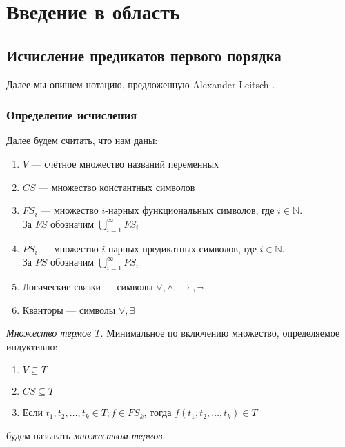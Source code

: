 \chapter{Введение в область}
\startrelatedwork
\label{sec:chap1}

\section{Исчисление предикатов первого порядка}

Далее мы опишем нотацию, предложенную Alexander Leitsch \cite{Leitsch:1997:RC:260906}.

\subsection{Определение исчисления}

Далее будем считать, что нам даны:
\begin{enumerate}
	\item $V$    --- счётное множество названий переменных
    \item $CS$   --- множество константных символов
    \item $FS_i$ --- множество $i$-нарных функциональных символов, где $i \in \mathbb{N}$. \\
    За $FS$ обозначим $\bigcup\limits_{i=1}^{\infty} FS_{i}$
    \item $PS_i$ --- множество $i$-нарных предикатных символов, где $i \in \mathbb{N}$. \\
    За $PS$ обозначим $\bigcup\limits_{i=1}^{\infty} PS_{i}$
    \item Логические связки --- символы $\vee, \wedge, \rightarrow, \neg$
    \item Кванторы --- символы $\forall, \exists$
\end{enumerate}



\begin{definition}
  \emph{Множество термов $T$.} Минимальное по включению множество, определяемое индуктивно:
  \begin{enumerate}
  	\item $V \subseteq T$
    \item $CS \subseteq T$
    \item Если $t_1, t_2, \ldots, t_k \in T; f \in FS_k$, тогда $f(t_1, t_2, \ldots, t_k) \in T$
  \end{enumerate}
  будем называть \emph{множеством термов}.
\end{definition}

